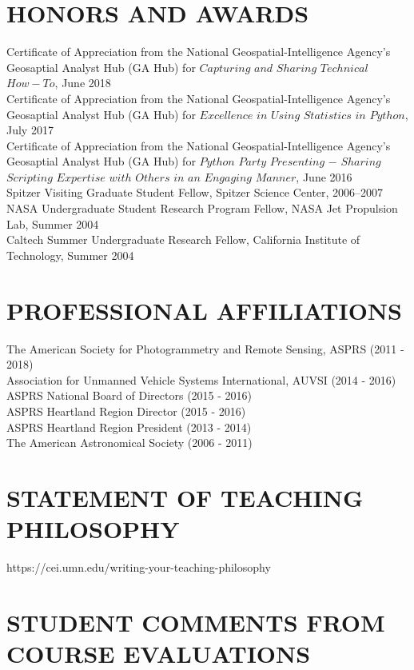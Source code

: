 \documentclass{res}
\begin{document}
\begin{resume}
\section{HONORS AND AWARDS} 
	Certificate of Appreciation from the National Geospatial-Intelligence Agency's Geosaptial Analyst Hub (GA Hub) for $Capturing$ $and$ $Sharing$ $Technical$ $How-To$, June 2018\\
	Certificate of Appreciation from the National Geospatial-Intelligence Agency's Geosaptial Analyst Hub (GA Hub) for $Excellence$ $in$ $Using$ $Statistics$ $in$ $Python$, July 2017\\
	Certificate of Appreciation from the National Geospatial-Intelligence Agency's Geosaptial Analyst Hub (GA Hub) for $Python$ $Party$ $Presenting$ $-$ $Sharing$ $Scripting$ $Expertise$ $with$ $Others$ $in$ $an$ $Engaging$ $Manner$, June 2016\\
   Spitzer Visiting Graduate Student Fellow, Spitzer Science Center, 2006--2007   \\      
   NASA Undergraduate Student Research Program Fellow, NASA Jet Propulsion Lab, Summer 2004\\        
   Caltech Summer Undergraduate Research Fellow, California Institute of Technology, Summer 2004  

\section{PROFESSIONAL AFFILIATIONS}      
The American Society for Photogrammetry and Remote Sensing, ASPRS (2011 - 2018)\\
Association for Unmanned Vehicle Systems International, AUVSI (2014 - 2016)\\
ASPRS National Board of Directors (2015 - 2016)\\
ASPRS Heartland Region Director (2015 - 2016)\\
ASPRS Heartland Region President (2013 - 2014)\\
The American Astronomical Society (2006 - 2011)\\


\section{STATEMENT OF TEACHING PHILOSOPHY}
https://cei.umn.edu/writing-your-teaching-philosophy
 
 
\section{STUDENT COMMENTS FROM COURSE EVALUATIONS}
   \vspace{-0.1in}	


\end{resume}
\end{document}
